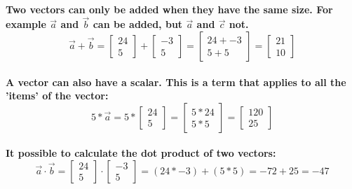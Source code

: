 \documentclass[11pt]{report}
\begin{document}
    \paragraph{
    Two vectors can only be added when they have the same size. For example \(\vec{a}\) and \(\vec{b}\) can be added, but \(\vec{a}\) and \(\vec{c}\) not. \[\vec{a} + \vec{b} = \begin{bmatrix}
        24\\
        5
    \end{bmatrix} +
    \begin{bmatrix}
        -3\\
        5
    \end{bmatrix} = \begin{bmatrix}
        24 +-3\\
        5+5
    \end{bmatrix} = \begin{bmatrix}
        21\\
        10
    \end{bmatrix}\]
    }

    \paragraph{
    A vector can also have a scalar. This is a term that applies to all the 'items' of the vector: \[ 5*\vec{a} = 5 * \begin{bmatrix}
        24\\
        5
    \end{bmatrix} = \begin{bmatrix}
        5 * 24\\
        5 * 5
    \end{bmatrix} = \begin{bmatrix}
        120\\
        25
    \end{bmatrix}\]
    }

    \paragraph{
    It possible to calculate the dot product of two vectors: \[\vec{a} \cdot \vec{b} = \begin{bmatrix}
        24\\
        5
    \end{bmatrix} \cdot 
    \begin{bmatrix}
        -3\\
        5
    \end{bmatrix} = (24 * -3) + (5 * 5) = -72 + 25 = -47\]
    }
\end{document}
